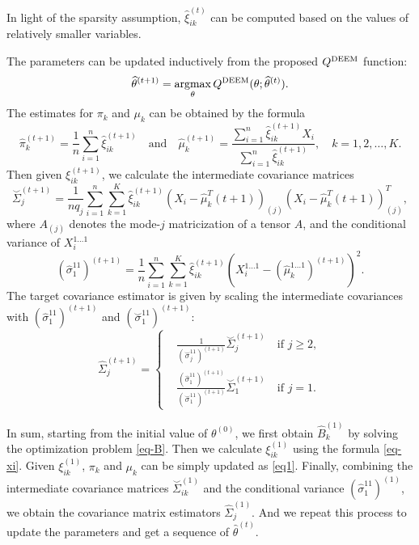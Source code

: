 \documentclass[11pt]{article}
\newcommand{\amax}{\operatorname*{argmax}}
\newcommand{\wh}{\widehat}
\begin{document}
In light of the sparsity assumption, $\wh\xi^{(t)}_{ik}$ can be computed based on the values of relatively smaller variables.




The parameters can be updated inductively from the proposed $Q^{\textup{DEEM}}$ function:
\begin{equation*}
  \wh\theta^{(t+1)} = \amax_\theta Q^{\textup{DEEM}}(\theta; \wh\theta^{(t)}).
\end{equation*}
The estimates for $\pi_k$ and $\mu_k$ can be obtained by the formula
\begin{equation}\label{eq1}
  \wh\pi_k^{(t+1)} = \frac{1}{n}\sum_{i=1}^n \wh\xi_{ik}^{(t+1)} \quad\text{and}\quad \wh\mu_k^{(t+1)} = \frac{\sum_{i=1}^n \wh\xi_{ik}^{(t+1)}X_i}{\sum_{i=1}^n \wh\xi_{ik}^{(t+1)}} ,\quad k=1,2,\dots, K.
\end{equation}
Then given $\xi_{ik}^{(t+1)}$, we calculate the intermediate covariance matrices
\begin{equation*}
  \overset  \smile \Sigma^{(t+1)}_j = \frac{1}{nq_j} \sum_{i=1}^n \sum_{k=1}^K \wh\xi^{(t+1)}_{ik} (X_i - \wh\mu_k^T{(t+1)})_{(j)} (X_i - \wh\mu_k^T{(t+1)})_{(j)} ^T,
\end{equation*}
where $A_{(j)}$ denotes the mode-$j$ matricization of a tensor $A$,
and the conditional variance of $X_i^{1\dots1}$
\begin{equation*}
  (\wh\sigma_{1}^{11})^{(t+1)} = \frac{1}{n}\sum_{i=1}^n \sum_{k=1}^K \wh\xi_{ik}^{(t+1)} (X_i^{1\dots1}-(\wh \mu_{k}^{1\dots1})^{(t+1)})^2.
\end{equation*}
The target covariance estimator is given by scaling the intermediate covariances with $(\wh\sigma_{1}^{11})^{(t+1)}$ and $(\overset \smile \sigma_1^{11})^{(t+1)}$:
\begin{equation*}
  \wh \Sigma_j^{(t+1)} =
  \left\{
  \begin{aligned}
  	&\frac{1}{(\overset \smile \sigma_j^{11})^{(t+1)}}\overset \smile \Sigma_j^{(t+1)} \quad \text{if $j\ge 2$}, \\
  	&\frac{(\wh \sigma_1^{11})^{(t+1)}}{(\overset \smile \sigma_1^{11})^{(t+1)}}\overset \smile \Sigma_1^{(t+1)} \quad \text{if $j= 1$}.
  \end{aligned}
  \right.
\end{equation*}

In sum, starting from the initial value of $\theta^{(0)}$, we first obtain $\wh B_k^{(1)}$ by solving the optimization problem \eqref{eq-B}. Then we calculate $\xi^{(1)}_{ik}$ using the formula \eqref{eq-xi}. Given $\xi^{(1)}_{ik}$, $\pi_{k}$ and $\mu_k$ can be simply updated as \eqref{eq1}. Finally, combining the intermediate covariance matrices $\overset \smile \Sigma_{ik}^{(1)}$ and the conditional variance $(\wh\sigma_1^{11})^{(1)}$, we obtain the covariance matrix estimators $\wh\Sigma_j^{(1)}$.
And we repeat this process to update the parameters and get a sequence of $\wh \theta^{(t)}$.
\end{document}
